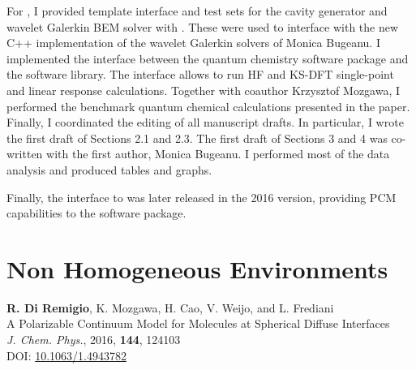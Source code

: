 For , I provided template interface and test sets for the cavity
generator\autocite{Harbrecht2009-no, Harbrecht2011-dk} and wavelet Galerkin
\acrshort{BEM} solver\autocite{Harbrecht2004-uo, Harbrecht2006-ug} with \pcmsolver.
These were used to interface with the new C++ implementation of the wavelet
Galerkin solvers of Monica Bugeanu.
I implemented the interface between the \LSDALTON quantum chemistry software
package and the \pcmsolver software library. The interface allows to run \acrshort{HF} and
\acrshort{KS}-\acrshort{DFT} single-point and linear response calculations.
Together with coauthor Krzysztof Mozgawa, I performed the benchmark quantum
chemical calculations presented in the paper.
Finally, I coordinated the editing of all manuscript drafts.
In particular, I wrote the first draft of Sections 2.1 and 2.3.
The first draft of Sections 3 and 4 was co-written with the first author, Monica Bugeanu.
I performed most of the data analysis and produced tables and graphs.

Finally, the interface to \LSDALTON was later released in the 2016 version,
providing \acrshort{PCM} capabilities to the software package.

\section{Non Homogeneous Environments}\label{sec:spherical}

\begin{tcolorbox}
  {\small
  \textbf{R. Di Remigio}, K. Mozgawa, H. Cao, V. Weijo, and L.
  Frediani
  \\
  \textsf{
  A Polarizable Continuum Model for Molecules at Spherical
  Diffuse Interfaces
  }
  \\
  \textit{J. Chem. Phys.}, \textrm{2016}, \textbf{144}, 124103
  \\
  DOI: \url{10.1063/1.4943782}
  }
\end{tcolorbox}


